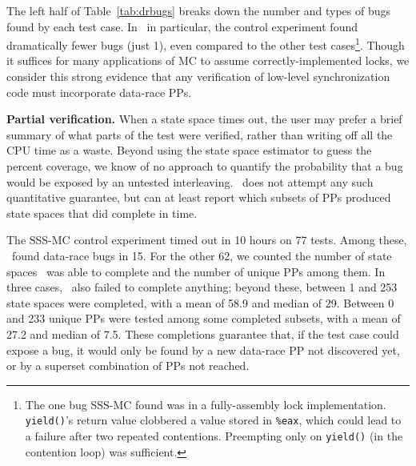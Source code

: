 The left half of Table~\ref{tab:drbugs}
breaks down the number and types of bugs found by each test case.
In \mxtest~in particular, the control experiment found dramatically fewer bugs (just 1),
even compared to the other test cases\footnote{
	The one bug SSS-MC found was in a fully-assembly lock implementation. {\tt yield()}'s return value clobbered a value stored in {\tt \%eax}, which could lead to a failure after two repeated contentions. Preempting only on {\tt yield()} (in the contention loop) was sufficient.}.
Though it suffices for many applications of MC to assume correctly-implemented locks,
we consider this strong evidence that any verification of low-level synchronization code must incorporate data-race PPs.

{\bf Partial verification.}
When a state space times out, the user may prefer a brief summary of what parts of the test were verified, rather than writing off all the CPU time as a waste.
Beyond using the state space estimator to guess the percent coverage,
we know of no approach to quantify the probability
that a bug would be exposed by an untested interleaving.
\quicksand~does not attempt any such quantitative guarantee,
but can at least report which subsets of PPs produced state spaces that did complete in time.

The SSS-MC control experiment timed out in 10 hours on 77 tests.
Among these, \quicksand~found data-race bugs in 15.
For the other 62, we counted the number of state spaces \quicksand~was able to complete and the number of unique PPs among them.
In three cases, \quicksand~also failed to complete anything; beyond these,
between 1 and 253 state spaces were completed, with a mean of 58.9 and median of 29.
Between 0 and 233 unique PPs were tested among some completed subsets, with a mean of 27.2 and median of 7.5.
These completions guarantee that, if the test case could expose a bug,
it would only be found by a new data-race PP not discovered yet, or by a superset combination of PPs not reached.


